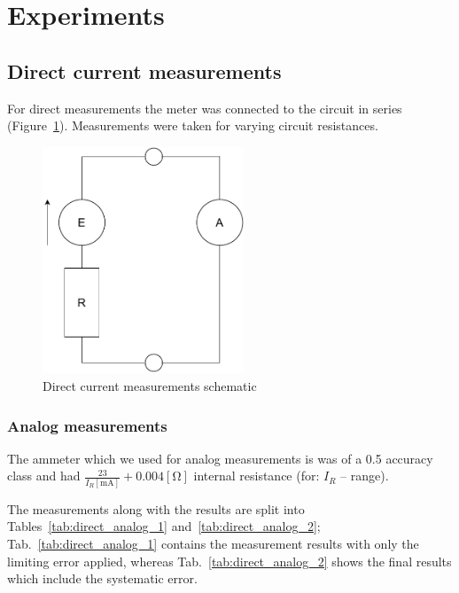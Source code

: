 \section{Experiments}

\subsection{Direct current measurements}

For direct measurements the meter was connected to the circuit in series (Figure~\ref{fig:direct_schematic}). Measurements were taken for varying circuit resistances.

\begin{figure}[H]
	\centering
	\includegraphics[width=6cm]{schematics/direct.pdf}
	\caption{Direct current measurements schematic}
	\label{fig:direct_schematic}
\end{figure}

\subsubsection{Analog measurements}

The ammeter which we used for analog measurements is was of a 0.5 accuracy class and had $\frac{23}{I_R  [\unit{\milli\ampere}]} + 0.004 [\unit{\ohm}]$ internal resistance (for: $I_R$ -- range).

The measurements along with the results are split into Tables~\ref{tab:direct_analog_1} and~\ref{tab:direct_analog_2}; Tab.~\ref{tab:direct_analog_1} contains the measurement results with only the limiting error applied, whereas Tab.~\ref{tab:direct_analog_2} shows the final results which include the systematic error.

